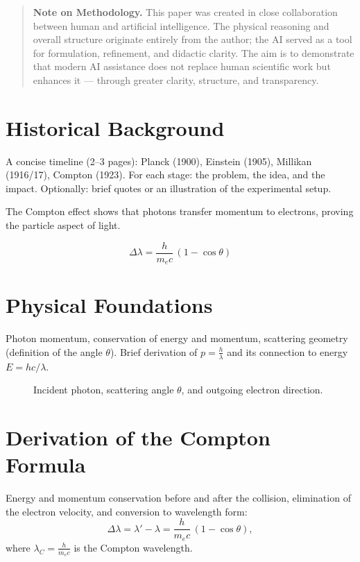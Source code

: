 \documentclass[12pt,oneside]{scrartcl}
\begin{document}
	\vspace{1.2em}
	\begin{quote}
		\small
		\textbf{Note on Methodology.}  
		This paper was created in close collaboration between human and artificial intelligence. 
		The physical reasoning and overall structure originate entirely from the author; the AI served as a tool for formulation, refinement, and didactic clarity. 
		The aim is to demonstrate that modern AI assistance does not replace human scientific work but enhances it — through greater clarity, structure, and transparency.
	\end{quote}
	\vspace{1.2em}
	
	
	\section{Historical Background}
	A \cite{einstein1909}concise timeline (2–3 pages): Planck (1900), Einstein (1905), Millikan (1916/17), Compton (1923). For each stage: the problem, the idea, and the impact. Optionally: brief quotes or an illustration of the experimental setup.
	\begin{PhysicsBox}
		The Compton effect shows that photons transfer momentum to electrons,
		proving the particle aspect of light.
	\end{PhysicsBox}
	
	\begin{MathBox}
		\[
		\Delta\lambda = \frac{h}{m_e c}\,(1 - \cos\theta)
		\]
	\end{MathBox}
	\section{Physical Foundations}
	Photon momentum, conservation of energy and momentum, scattering geometry (definition of the angle $\theta$). Brief derivation of $p = \tfrac{h}{\lambda}$ and its connection to energy $E = hc/\lambda$.
	
	\begin{figure}[h]
		\centering
		\caption{Incident photon, scattering angle $\theta$, and outgoing electron direction.}
		\label{fig:geometry}
	\end{figure}
	
	\section{Derivation of the Compton Formula}
	Energy and momentum conservation before and after the collision, elimination of the electron velocity, and conversion to wavelength form:
	\begin{equation}
		\Delta\lambda = \lambda' - \lambda = \frac{h}{m_e c}\,(1 - \cos\theta),
		\label{eq:compton}
	\end{equation}
	where $\lambda_C = \tfrac{h}{m_e c}$ is the Compton wavelength.
	
\end{document}
